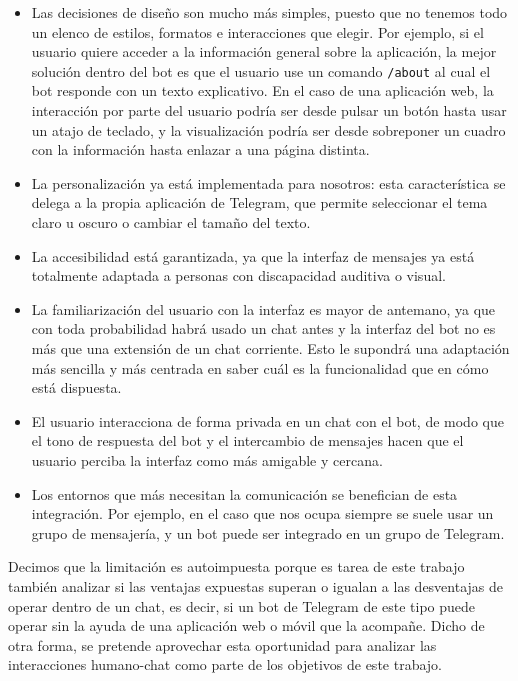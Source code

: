 \begin{itemize}
    \item Las decisiones de diseño son mucho más simples, puesto que no tenemos todo un elenco de estilos, formatos e interacciones que elegir. Por ejemplo, si el usuario quiere acceder a la información general sobre la aplicación, la mejor solución dentro del bot es que el usuario use un comando \texttt{/about} al cual el bot responde con un texto explicativo. En el caso de una aplicación web, la interacción por parte del usuario podría ser desde pulsar un botón hasta usar un atajo de teclado, y la visualización podría ser desde sobreponer un cuadro con la información hasta enlazar a una página distinta.
    \item La personalización ya está implementada para nosotros: esta característica se delega a la propia aplicación de Telegram, que permite seleccionar el tema claro u oscuro o cambiar el tamaño del texto.
    \item La accesibilidad está garantizada, ya que la interfaz de mensajes ya está totalmente adaptada a personas con discapacidad auditiva o visual.
    \item La familiarización del usuario con la interfaz es mayor de antemano, ya que con toda probabilidad habrá usado un chat antes y la interfaz del bot no es más que una extensión de un chat corriente. Esto le supondrá una adaptación más sencilla y más centrada en saber cuál es la funcionalidad que en cómo está dispuesta.
    \item El usuario interacciona de forma privada en un chat con el bot, de modo que el tono de respuesta del bot y el intercambio de mensajes hacen que el usuario perciba la interfaz como más amigable y cercana.
    \item Los entornos que más necesitan la comunicación se benefician de esta integración. Por ejemplo, en el caso que nos ocupa siempre se suele usar un grupo de mensajería, y un bot puede ser integrado en un grupo de Telegram.
\end{itemize}

Decimos que la limitación es autoimpuesta porque es tarea de este trabajo también analizar si las ventajas expuestas superan o igualan a las desventajas de operar dentro de un chat, es decir, si un bot de Telegram de este tipo puede operar sin la ayuda de una aplicación web o móvil que la acompañe. Dicho de otra forma, se pretende aprovechar esta oportunidad para analizar las interacciones humano-chat como parte de los objetivos de este trabajo.


